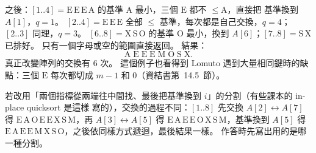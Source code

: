 \begin{pastsoln}
之後：$[1..4] = \mathrm{E\,E\,E\,A}$ 的基準 $\mathrm{A}$ 最小，三個 $\mathrm{E}$ 都不 $\le \mathrm{A}$，直接把
基準換到 $A[1]$，$q = 1$。 $[2..4] = \mathrm{E\,E\,E}$ 全部 $\le$ 基準，每次都是自己交換，$q = 4$；
$[2..3]$ 同理，$q = 3$。 $[6..8] = \mathrm{X\,S\,O}$ 的基準 $\mathrm{O}$ 最小，換到 $A[6]$；$[7..8] =
\mathrm{S\,X}$ 已排好。 只有一個字母或空的範圍直接返回。 結果：
\[
\mathrm{A\;E\;E\;E\;M\;O\;S\;X}.
\]
真正改變陣列的交換有 $6$ 次。 這個例子也看得到 Lomuto 遇到大量相同鍵時的缺點：三個 $\mathrm{E}$
每次都切成 $m - 1$ 和 $0$（資結書第~14.5~節）。

若改用「兩個指標從兩端往中間找、最後把基準換到 $i$」的分割（有些課本的 in-place quicksort 是這樣
寫的），交換的過程不同：$[1..8]$ 先交換 $A[2] \leftrightarrow A[7]$ 得 $\mathrm{E\,A\,O\,E\,E\,X\,S\,M}$，再
$A[3] \leftrightarrow A[5]$ 得 $\mathrm{E\,A\,E\,E\,O\,X\,S\,M}$，基準換到 $A[5]$ 得
$\mathrm{E\,A\,E\,E\,M\,X\,S\,O}$，之後依同樣方式遞迴，最後結果一樣。 作答時先寫出用的是哪一種分割。
\end{pastsoln}

